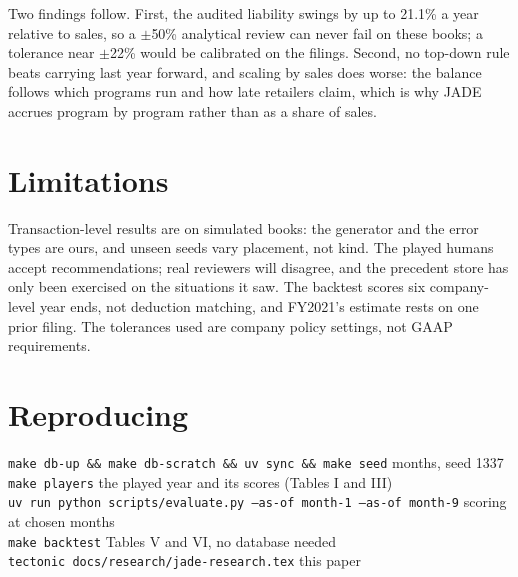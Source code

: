 \documentclass[10pt,letterpaper]{article}
\begin{document}
Two findings follow. First, the audited liability swings by up to 21.1\% a year relative to sales, so a
$\pm$50\% analytical review can never fail on these books; a tolerance near $\pm$22\% would be calibrated
on the filings. Second, no top-down rule beats carrying last year forward, and scaling by sales does worse:
the balance follows which programs run and how late retailers claim, which is why JADE accrues program by
program rather than as a share of sales.

\section{Limitations}
Transaction-level results are on simulated books: the generator and the error types are ours, and
unseen seeds vary placement, not kind. The played humans accept recommendations; real reviewers will
disagree, and the precedent store has only been exercised on the situations it saw. The backtest scores
six company-level year ends, not deduction matching, and FY2021's estimate rests on one prior filing.
The tolerances used are company policy settings, not GAAP requirements.

\section{Reproducing}
\begin{flushleft}\small
\texttt{make db-up \&\& make db-scratch \&\& uv sync \&\& make seed}  months, seed 1337\\
\texttt{make players} \quad the played year and its scores (Tables I and III)\\
\texttt{uv run python scripts/evaluate.py --as-of month-1 --as-of month-9} \quad scoring at chosen months\\
\texttt{make backtest} \quad Tables V and VI, no database needed\\
\texttt{tectonic docs/research/jade-research.tex} \quad this paper
\end{flushleft}
\end{document}
